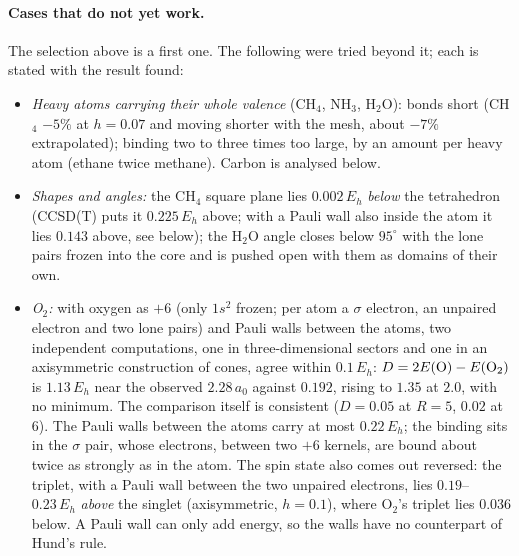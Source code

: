 \documentclass[11pt]{article}
\begin{document}
\paragraph{Cases that do not yet work.} The selection above is a first one. The following were tried
beyond it; each is stated with the result found:
\begin{itemize}
\item \emph{Heavy atoms carrying their whole valence} (CH$_4$, NH$_3$, H$_2$O): bonds short (CH$_4$
  $-5\%$ at $h = 0.07$ and moving shorter with the mesh, about $-7\%$ extrapolated); binding two to three
  times too large, by an amount per heavy atom (ethane twice methane). Carbon is analysed below.
\item \emph{Shapes and angles:} the CH$_4$ square plane lies $0.002\,E_h$ \emph{below} the tetrahedron
  (CCSD(T) puts it $0.225\,E_h$ above; with a Pauli wall also inside the atom it lies $0.143$ above, see below); the H$_2$O angle closes below $95^\circ$ with the lone pairs
  frozen into the core and is pushed open with them as domains of their own.
\item \emph{O$_2$:} with oxygen as $+6$ (only $1s^2$ frozen; per atom a $\sigma$ electron, an unpaired electron
  and two lone pairs) and Pauli walls between the atoms, two independent computations, one in three-dimensional
  sectors and one in an axisymmetric construction of cones, agree within $0.1\,E_h$: $D = 2E({\rm O})-E({\rm O}_2)$
  is $1.13\,E_h$ near the observed $2.28\,a_0$ against $0.192$, rising to $1.35$ at $2.0$, with no minimum. The
  comparison itself is consistent ($D = 0.05$ at $R = 5$, $0.02$ at $6$). The Pauli walls between the atoms carry
  at most $0.22\,E_h$; the binding sits in the $\sigma$ pair, whose electrons, between two $+6$ kernels, are bound
  about twice as strongly as in the atom. The spin state also comes out reversed: the triplet, with a Pauli wall
  between the two unpaired electrons, lies $0.19$--$0.23\,E_h$ \emph{above} the singlet (axisymmetric, $h = 0.1$),
  where O$_2$'s triplet lies $0.036$ below. A Pauli wall can only add energy, so the walls have no counterpart
  of Hund's rule.

\end{itemize}
\end{document}
